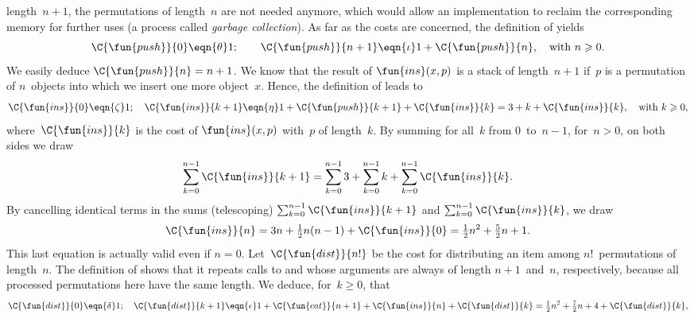 length~\(n+1\), the permutations of length~\(n\) are not needed
anymore, which would allow an implementation to reclaim the
corresponding memory for further uses (a process called \emph{garbage
  collection}). As far as the costs are
concerned, the definition of  yields
\begin{equation*}
\C{\fun{push}}{0} \eqn{\theta} 1;\qquad
\C{\fun{push}}{n+1} \eqn{\iota} 1 + \C{\fun{push}}{n},\quad
\text{with \(n \geqslant 0\)}.
\end{equation*}
We easily deduce \(\C{\fun{push}}{n} = n +
1\). We know that the result of
\(\fun{ins}(x,p)\) is a stack of length~\(n+1\) if~\(p\) is a
permutation of \(n\)~objects into which we insert one more
object~\(x\). Hence, the definition of  leads to
\begin{equation*}
\C{\fun{ins}}{0}   \eqn{\zeta} 1;\quad
\C{\fun{ins}}{k+1} \eqn{\eta} 1 + \C{\fun{push}}{k+1} +
\C{\fun{ins}}{k} = 3 + k + \C{\fun{ins}}{k}, \quad \text{with \(k
                   \geqslant 0\)},
\end{equation*}
where~\(\C{\fun{ins}}{k}\) is the cost of \(\fun{ins}(x,p)\)
with~\(p\) of length~\(k\). By summing for all~\(k\) from
\(0\)~to~\(n-1\), for~\(n>0\), on both sides we draw
\begin{equation*}
\sum_{k=0}^{n-1}{\C{\fun{ins}}{k+1}}
  = \sum_{k=0}^{n-1}{3} + \sum_{k=0}^{n-1}{k}
     + \sum_{k=0}^{n-1}{\C{\fun{ins}}{k}}.
\end{equation*}
By cancelling identical terms in the sums (telescoping)
\(\sum_{k=0}^{n-1}{\C{\fun{ins}}{k+1}}\) and
\(\sum_{k=0}^{n-1}{\C{\fun{ins}}{k}}\), we draw
\begin{equation*}
\C{\fun{ins}}{n}
  = 3n + \tfrac{1}{2}n(n-1) + \C{\fun{ins}}{0}
  = \tfrac{1}{2}{n^2} + \tfrac{5}{2}{n} + 1.
\end{equation*}
This last equation is actually valid even if \(n =
0\). Let~\(\C{\fun{dist}}{n!}\) be the cost for distributing an item
among \(n!\)~permutations of length~\(n\). The definition of
 shows that it repeats calls to
 and
 whose arguments are always of
length \(n+1\)~and~\(n\), respectively, because all processed
permutations here have the same length. We deduce, for~\(k \geqslant
0\), that
\begin{equation*}
\C{\fun{dist}}{0} \eqn{\delta} 1;\quad
\C{\fun{dist}}{k+1}
  \eqn{\epsilon} 1 + \C{\fun{cat}}{n+1} + \C{\fun{ins}}{n}
                    + \C{\fun{dist}}{k}
  = \tfrac{1}{2}{n^2} + \tfrac{7}{2}{n} + 4 + \C{\fun{dist}}{k},
\end{equation*}
